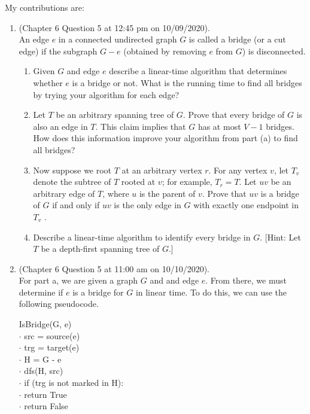 \documentclass{article}
\begin{document}
My contributions are:
\begin{enumerate}
    \item (Chapter 6 Question 5 at 12:45 pm on 10/09/2020). \\
        An edge $e$ in a connected undirected graph $G$ is called a bridge (or a cut edge) if the subgraph $G - e $ (obtained by removing $e$ from $G$) is disconnected.
        \begin{enumerate}[label=(\alph*)]
            \item Given $G$ and edge $e$ describe a linear-time algorithm that determines whether $e$ is a bridge or not. What is the running time to find all bridges by trying your algorithm for each edge?
            \item Let $T$ be an arbitrary spanning tree of $G$. Prove that every bridge of $G$ is also an edge in $T$. This claim implies that $G$ has at most $V-1$ bridges. How does this information improve your algorithm from part (a) to find all bridges?
            \item Now suppose we root $T$ at an arbitrary vertex $r$. For any vertex $v$, let $T_v$ denote the subtree of $T$ rooted at $v$; for example, $T_r = T$. Let $uv$ be an arbitrary edge of $T$, where $u$ is the parent of $v$. Prove that $uv$ is a bridge of $G$ if and only if $uv$ is the only edge in $G$ with exactly one endpoint in $T_v$ .
            \item Describe a linear-time algorithm to identify every bridge in $G$. [Hint: Let $T$ be a depth-first spanning tree of $G$.]
        \end{enumerate}
    \item (Chapter 6 Question 5 at 11:00 am on 10/10/2020). \\
        For part a, we are given a graph $G$ and and edge $e$. From there, we must determine if $e$ is a bridge for $G$ in linear time. To do this, we can use the following pseudocode.

        \begin{algorithm}
            IsBridge(G, e) \\
            $\cdot$ \hspace{1em} src = source(e) \\
            $\cdot$ \hspace{1em} trg = target(e) \\
            $\cdot$ \hspace{1em} H = G - e \\
            $\cdot$ \hspace{1em} dfs(H, src) \\
            $\cdot$ \hspace{1em} if (trg is not marked in H): \\
            $\cdot$ \hspace{2em} return True \\
            $\cdot$ \hspace{1em} return False \\
        \end{algorithm}


\end{enumerate}
\end{document}
